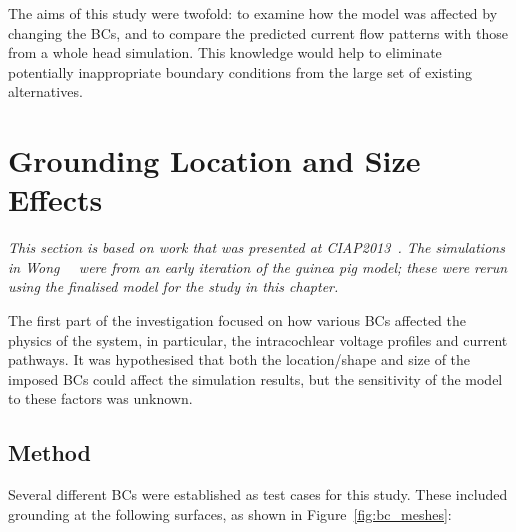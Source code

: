 The aims of this study were twofold: to examine how the model was affected by
changing the BCs, and to compare the predicted current flow patterns with those
from a whole head simulation. This knowledge would help to eliminate potentially
inappropriate boundary conditions from the large set of existing alternatives.


\section{Grounding Location and Size Effects}

\textit{This section is based on work that was presented at
CIAP2013~\cite{wong2013ciap,tran2013ciap}. The simulations in
Wong~\etal~\cite{wong2013ciap} were from an early iteration of the guinea pig
model; these were rerun using the finalised model for the study in this
chapter.}

The first part of the investigation focused on how various BCs affected the
physics of the system, in particular, the intracochlear voltage profiles and
current pathways. It was hypothesised that both the location/shape and size of
the imposed BCs could affect the simulation results, but the sensitivity of the
model to these factors was unknown.

\subsection{Method}

Several different BCs were established as test cases for this study. These
included grounding at the following surfaces, as shown in
Figure~\ref{fig:bc_meshes}:

